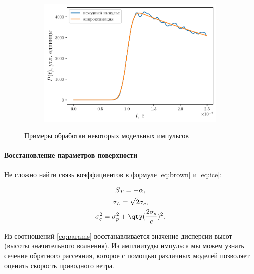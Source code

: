 \begin{figure}[ht]
\begin{subfigure}{0.5\linewidth}
    \end{subfigure}
    \begin{subfigure}{0.5\linewidth}
        \centering
        \includegraphics[width=\linewidth]{fig/retracking/imp_15a_3}
    \end{subfigure}
    \label{fig:example-impulses}
    \caption{Примеры обработки некоторых модельных импульсов}
\end{figure}






\paragraph{Восстановление параметров поверхности}%
Не сложно найти связь коэффициентов в формуле \eqref{eq:brown} и \eqref{eq:ice}:

\begin{equation}
    \label{eq:params}
    \begin{gathered}
        S_T = - \alpha,\\
        \sigma_L = \sqrt 2 \sigma_c,\\
        \sigma_c^2 = \sigma_p^2 + \qty(\frac{2\sigma_s}{c})^2.
    \end{gathered}
\end{equation}

Из соотношений \eqref{eq:params} восстанавливается значение дисперсии высот
(высоты значительного  волнения). 
Из амплиитуды импульса мы можем узнать сечение обратного рассеяния, которое с
помощью различных моделей позволяет оценить скорость приводного ветра.




